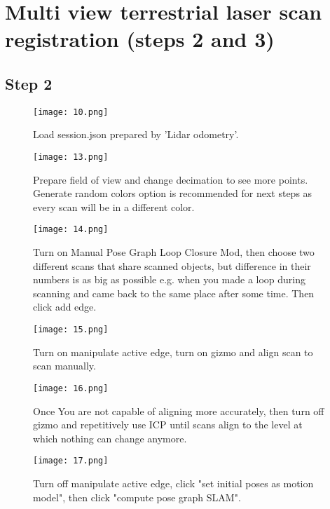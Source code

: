 \chapter{Multi view terrestrial laser scan registration (steps 2 and 3)}
\section{Step 2}
\begin{figure}[H]
	\centering
	\texttt{[image: 10.png]}
	\caption{Load session.json prepared by 'Lidar odometry'.}
	\label{fig:10}
\end{figure}

\begin{figure}[H]
	\centering
	\texttt{[image: 13.png]}
	\caption{Prepare field of view and change decimation to see more points. Generate random colors option is recommended for next steps as every scan will be in a different color.}
	\label{fig:13}
\end{figure}

\begin{figure}[H]
	\centering
	\texttt{[image: 14.png]}
	\caption{Turn on Manual Pose Graph Loop Closure Mod, then choose two different scans that share scanned objects, but difference in their numbers is as big as possible e.g. when you made a loop during scanning and came back to the same place after some time. Then click add edge.} 
	\label{fig:14}
\end{figure}

\begin{figure}[H]
	\centering
	\texttt{[image: 15.png]}
	\caption{Turn on manipulate active edge, turn on gizmo and align scan to scan manually.}
	\label{fig:15}
\end{figure}

\begin{figure}[H]
	\centering
	\texttt{[image: 16.png]}
	\caption{Once You are not capable of aligning more accurately, then turn off gizmo and repetitively use ICP until scans align to the level at which nothing can change anymore.}
	\label{fig:16}
\end{figure}

\begin{figure}[H]
	\centering
	\texttt{[image: 17.png]}
	\caption{Turn off manipulate active edge, click "set initial poses as motion model", then click "compute pose graph SLAM".}
	\label{fig:17}
\end{figure}

